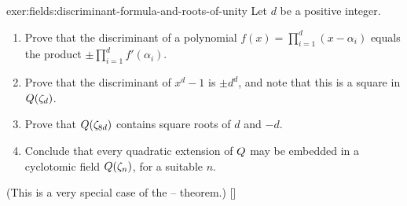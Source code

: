 \begin{exer}{}{exer:fields:discriminant-formula-and-roots-of-unity}
  Let $d$ be a positive integer.
  \begin{enumerate}[label=(\roman*)]
  \item Prove that the discriminant of a polynomial
    $f(x) = \prod_{i=1}^{d}(x - \alpha_i)$ equals the product
    $\pm \prod_{i=1}^{d} f'(\alpha_i)$.
  \item Prove that the discriminant of $x^d - 1$ is $\pm d^d$, and
    note that this is a square in $Q(\zeta_d)$.
  \item Prove that $Q(\zeta_{8d})$ contains square roots of $d$ and
    $-d$.
  \item Conclude that every quadratic extension of $Q$ may be
    embedded in a cyclotomic field $Q(\zeta_n)$, for a suitable $n$.
  \end{enumerate}
  (This is a very special case of the --
  theorem.)
  []
\end{exer}

